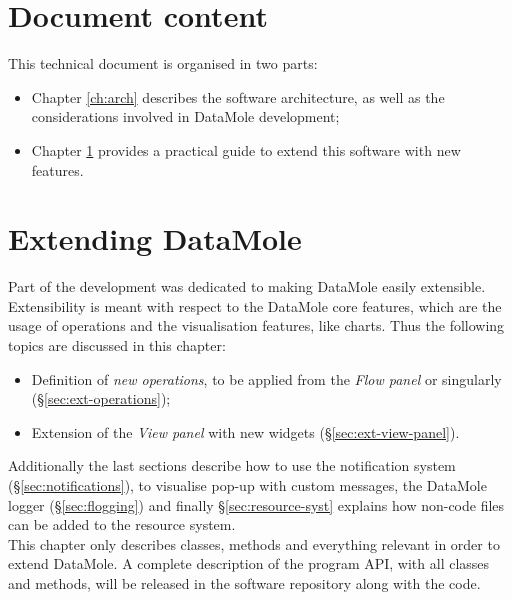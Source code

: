 \usepackage[capitalise]{cleveref}

                    


\graphicspath{{./images/dev-manual/}{./images/}}
\maketitle

\chapter*{Document content}
This technical document is organised in two parts:
\begin{itemize}
	\item Chapter \ref{ch:arch} describes the software architecture, as well as the considerations involved in DataMole development;
	\item Chapter \ref{ch:ext-man} provides a practical guide to extend this software with new features.
\end{itemize}





\chapter{Extending DataMole}\label{ch:ext-man}

Part of the development was dedicated to making DataMole easily extensible. Extensibility is meant with respect to the DataMole core features, which are the usage of operations and the visualisation features, like charts. 
Thus the following topics are discussed in this chapter:
\begin{itemize}
	\item Definition of \textit{new operations}, to be applied from the \textit{Flow panel} or singularly (§\ref{sec:ext-operations});
	\item Extension of the \textit{View panel} with new widgets (§\ref{sec:ext-view-panel}).
\end{itemize}
Additionally the last sections describe how to use the notification system (§\ref{sec:notifications}), to visualise pop-up with custom messages, the DataMole logger (§\ref{sec:flogging}) and finally §\ref{sec:resource-syst} explains how non-code files can be added to the resource system.\\
This chapter only describes classes, methods and everything relevant in order to extend DataMole. A complete description of the program API, with all classes and methods, will be released in the software repository along with the code.

